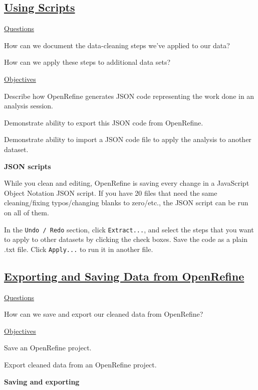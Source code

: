 \documentclass[12pt]{article}
\begin{document}
\vspace{-0.5em}\subsection{\href{https://datacarpentry.org/openrefine-socialsci/05-scripts/index.html}{\textbf{Using Scripts}}}
\color{gray}
\underline{Questions}

How can we document the data-cleaning steps we’ve applied to our data?

How can we apply these steps to additional data sets?

\underline{Objectives}

Describe how OpenRefine generates JSON code representing the work done in an analysis session.

Demonstrate ability to export this JSON code from OpenRefine.

Demonstrate ability to import a JSON code file to apply the analysis to another dataset.

\color{black}
\vspace{0.7em}
\textbf{JSON scripts}

While you clean and editing, OpenRefine is saving every change in a JavaScript Object Notation JSON script. If you have 20 files that need the same cleaning/fixing typos/changing blanks to zero/etc., the JSON script can be run on all of them.

In the \texttt{Undo / Redo} section, click \texttt{Extract...}, and select the steps that you want to apply to other datasets by clicking the check boxes. Save the code as a plain .txt file. Click \texttt{Apply...} to run it in another file.

\vspace{-0.5em}\subsection{\href{https://datacarpentry.org/openrefine-socialsci/06-saving/index.html}{\textbf{Exporting and Saving Data from OpenRefine}}}
\color{gray}
\underline{Questions}

How can we save and export our cleaned data from OpenRefine?

\underline{Objectives}

Save an OpenRefine project.

Export cleaned data from an OpenRefine project.

\color{black}
\vspace{0.7em}
\textbf{Saving and exporting}
\end{document}
